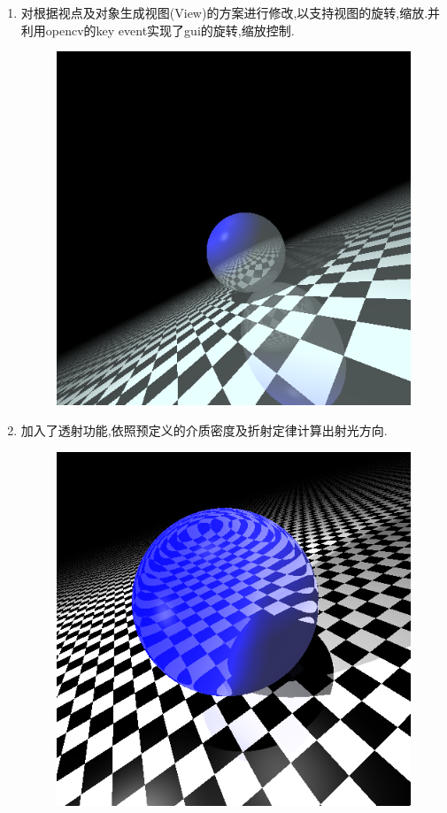 \begin{enumerate}
\item 对根据视点及对象生成视图(View)的方案进行修改,以支持视图的旋转,缩放.并利用opencv的key event实现了gui的旋转,缩放控制.
\begin{figure}[H]
  \centering
  \includegraphics[scale=0.4]{img/rotate.png}
  \caption*{\label{fig:rotate}}
\end{figure}

\item 加入了透射功能,依照预定义的介质密度及折射定律计算出射光方向.
\begin{figure}[H]
  \centering
  \includegraphics[scale=0.4]{img/transmission.png}
  \caption*{\label{fig:transmission}}
\end{figure}


\end{enumerate}
